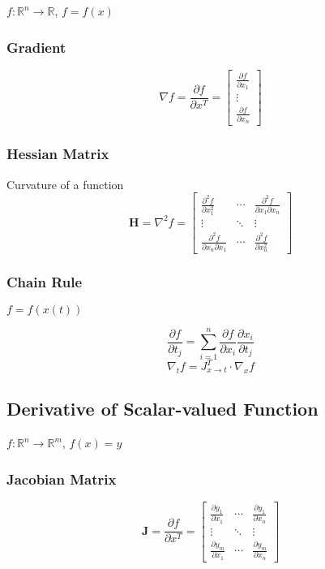 \documentclass{article}
\begin{document}
$f: \mathbb{R}^n \to \mathbb{R}$, $f = f(x)$

\subsubsection{Gradient}

\[
    \nabla f = \frac{\partial f}{\partial x^T} = \begin{bmatrix}
        \frac{\partial f}{\partial x_1} \\
        \vdots \\
        \frac{\partial f}{\partial x_n}
    \end{bmatrix}
\]

\subsubsection{Hessian Matrix}
Curvature of a function
\[
    \mathbf{H} = \nabla^2 f = \begin{bmatrix}
        \frac{\partial^2 f}{\partial x_1^2} & \cdots & \frac{\partial^2 f}{\partial x_1 \partial x_n} \\
        \vdots & \ddots & \vdots \\
        \frac{\partial^2 f}{\partial x_n \partial x_1} & \cdots & \frac{\partial^2 f}{\partial x_n^2}
    \end{bmatrix}
\]

\subsubsection{Chain Rule}

$f = f(x(t))$

\[
    \frac{\partial f}{\partial t_j} = \sum_{i=1}^n \frac{\partial f}{\partial x_i} \frac{\partial x_i}{\partial t_j}
\]
\[
    \nabla_t f = J_{x \to t}^T \cdot \nabla_x f
\]

\subsection{Derivative of Scalar-valued Function}

$f: \mathbb{R}^n \to \mathbb{R}^m$, $f(x) = y$

\subsubsection{Jacobian Matrix}

\[
    \mathbf{J} = \frac{\partial f}{\partial x^T} = \begin{bmatrix}
        \frac{\partial y_1}{\partial x_1} & \cdots & \frac{\partial y_1}{\partial x_n} \\
        \vdots & \ddots & \vdots \\
        \frac{\partial y_m}{\partial x_1} & \cdots & \frac{\partial y_m}{\partial x_n}
    \end{bmatrix}
\]
\end{document}
